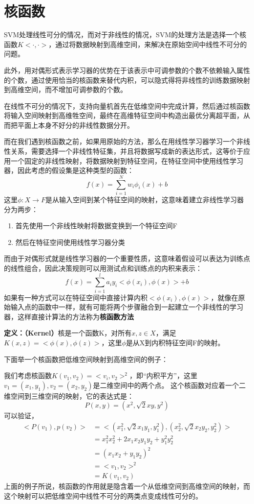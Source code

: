 \section{核函数}
SVM处理线性可分的情况，而对于非线性的情况，SVM的处理方法是选择一个核函数$K<\cdot,\cdot>$，通过将数据映射到高维空间，来解决在原始空间中线性不可分的问题。

此外，用对偶形式表示学习器的优势在于该表示中可调参数的个数不依赖输入属性的个数，通过使用恰当的核函数来替代内积，可以隐式得将非线性的训练数据映射到高维空间，而不增加可调参数的个数。

在线性不可分的情况下，支持向量机首先在低维空间中完成计算，然后通过核函数将输入空间映射到高维牲空间，最终在高维特征空间中构造出最优分离超平面，从而把平面上本身不好分的非线性数据分开。

而在我们遇到核函数之前，如果用原始的方法，那么在用线性学习器学习一个非线性关系，需要选择一个非线性特征集，并且将数据写成新的表达形式，这等价于应用一个固定的非线性映射，将数据映射到特征空间，在特征空间中使用线性学习器，因此考虑的假设集是这种类型的函数：
\begin{equation}
	f(x) = \sum_{i = 1}^Nw_i\phi_i(x) + b
\end{equation}
这里$\phi:X\to F$是从输入空间到某个特征空间的映射，这意味着建立非线性学习器分为两步：
\begin{enumerate}
	\item 首先使用一个非线性映射将数据变换到一个特征空间F
	\item 然后在特征空间使用线性学习器分类 
\end{enumerate}
而由于对偶形式就是线性学习器的一个重要性质，这意味着假设可以表达为训练点的线性组合，因此决策规则可以用测试点和训练点的内积来表示：
\begin{equation}
	f(x) = \sum_{i = 1}^la_iy_i<\phi(x_i),\phi(x)> + b	
\end{equation}
如果有一种方式可以在特征空间中直接计算内积$<\phi(x_i),\phi(x)>$，就像在原始输入点的函数中一样，就有可能将两个步骤融合到一起建立一个非线性的学习器，这样直接计算法的方法称为\textbf{核函数方法}

\textbf{定义：（Kernel）}核是一个函数K，对所有$x,z\in X$，满足$K(x,z) = <\phi(x),\phi(z)>$，这里$\phi$是从X到内积特征空间F的映射。

下面举一个核函数把低维空间映射到高维空间的例子：

我们考虑核函数$K(v_1,v_2) = <v_i,v_2>^2$，即“内积平方”，这里$v_1 = (x_1,y_1),v_2 = (x_2,y_2)$是二维空间中的两个点。
这个核函数对应着一个二维空间到三维空间的映射，它的表达式是：
$$P(x,y) = (x^2,\sqrt{2}xy, y^2)$$
可以验证，
\begin{equation*}
	\begin{aligned}
		<P(v_1), p(v_2)> &= <(x_1^2,\sqrt{2}x_1y_1, y_1^2),(x_2^2,\sqrt{2}x_2y_2, y_2^2)> \\
		&= x_1^2x_2^2 + 2x_1x_2y_1y_2 + y_1^2y_2^2 \\
		&= (x_1x_2 + y_1y_2)^2 \\
		&= <v_1,v_2>^2 \\
		&= K(v_1,v_2)
	\end{aligned}
\end{equation*}
上面的例子所说，核函数的作用就是隐含着一个从低维空间到高维空间的映射，而这个映射可以把低维空间中线性不可分的两类点变成线性可分的。

